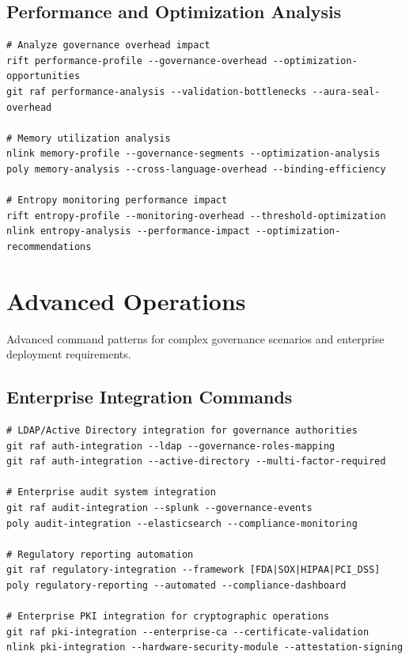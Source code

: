 \documentclass[11pt,letterpaper]{article}
\begin{document}
\subsection{Performance and Optimization Analysis}

\begin{lstlisting}[language=shell, caption=Performance Diagnostic Commands]
# Analyze governance overhead impact
rift performance-profile --governance-overhead --optimization-opportunities
git raf performance-analysis --validation-bottlenecks --aura-seal-overhead

# Memory utilization analysis
nlink memory-profile --governance-segments --optimization-analysis
poly memory-analysis --cross-language-overhead --binding-efficiency

# Entropy monitoring performance impact
rift entropy-profile --monitoring-overhead --threshold-optimization
nlink entropy-analysis --performance-impact --optimization-recommendations
\end{lstlisting}

\section{Advanced Operations}

Advanced command patterns for complex governance scenarios and enterprise deployment requirements.

\subsection{Enterprise Integration Commands}

\begin{lstlisting}[language=shell, caption=Enterprise Integration]
# LDAP/Active Directory integration for governance authorities
git raf auth-integration --ldap --governance-roles-mapping
git raf auth-integration --active-directory --multi-factor-required

# Enterprise audit system integration
git raf audit-integration --splunk --governance-events
poly audit-integration --elasticsearch --compliance-monitoring

# Regulatory reporting automation
git raf regulatory-integration --framework [FDA|SOX|HIPAA|PCI_DSS]
poly regulatory-reporting --automated --compliance-dashboard

# Enterprise PKI integration for cryptographic operations
git raf pki-integration --enterprise-ca --certificate-validation
nlink pki-integration --hardware-security-module --attestation-signing
\end{lstlisting}
\end{document}
